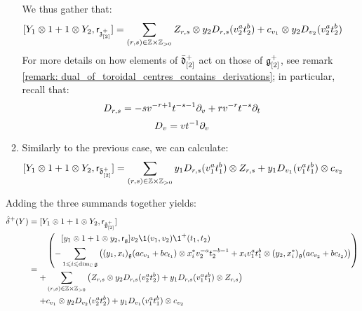\begin{remark}
\begin{enumerate}
\begin{enumerate}
                        We thus gather that:
                            $$[Y_1 \tensor 1 + 1 \tensor Y_2, \sfr_{\z_{[2]}^+}] = \sum_{(r, s) \in \Z \x \Z_{> 0}} Z_{r, s} \tensor y_2 D_{r, s}(v_2^a t_2^b) + c_{v_1} \tensor y_2 D_{v_2}(v_2^a t_2^b)$$
                        For more details on how elements of $\bar{\mathfrak{d}}_{[2]}^+$ act on those of $\mathfrak{g}_{[2]}^+$, see remark \ref{remark: dual_of_toroidal_centres_contains_derivations}; in particular, recall that:
                            $$D_{r, s} = -s v^{-r + 1} t^{-s - 1} \partial_v + r v^{-r} t^{-s} \partial_t$$
                            $$D_v = v t^{-1} \partial_v$$
                        \item Similarly to the previous case, we can calculate:
                            $$[Y_1 \tensor 1 + 1 \tensor Y_2, \sfr_{\bar{\d}_{[2]}^+}] = \sum_{(r, s) \in \Z \x \Z_{> 0}} y_1 D_{r, s}(v_1^a t_1^b) \tensor Z_{r, s} + y_1 D_{v_1}(v_1^a t_1^b) \tensor c_{v_2}$$
                    \end{enumerate}
                    Adding the three summands together yields:
                        $$
                            \begin{aligned}
                                \hat{\delta}^+(Y) & = [Y_1 \tensor 1 + 1 \tensor Y_2, \sfr_{ \hat{\g}_{[2]}^+ }]
                                \\
                                & = 
                                \begin{aligned}
                                    & \left( \begin{aligned}
                                        & [y_1 \tensor 1 + 1 \tensor y_2, \sfr_{\g}] v_2 \1(v_1, v_2) \1^+(t_1, t_2)
                                        \\
                                        - & \sum_{1 \leq i \leq \dim_{\bbC} \g} \left( (y_1, x_i)_{\g} ( a c_{v_1} + b c_{t_1} ) \tensor x_i^* v_2^{-a} t_2^{-b - 1} + x_i v_1^a t_1^b \tensor (y_2, x_i^*)_{\g} ( a c_{v_2} + b c_{t_2} ) \right)
                                    \end{aligned}
                                    \right)
                                    \\
                                    + & \sum_{(r, s) \in \Z \x \Z_{> 0}} \left( Z_{r, s} \tensor y_2 D_{r, s}(v_2^a t_2^b) + y_1 D_{r, s}(v_1^a t_1^b) \tensor Z_{r, s} \right)
                                    \\
                                    + & c_{v_1} \tensor y_2 D_{v_2}(v_2^a t_2^b) + y_1 D_{v_1}(v_1^a t_1^b) \tensor c_{v_2}
                                \end{aligned}
                            \end{aligned}
                        $$


\end{enumerate}
\end{remark}
